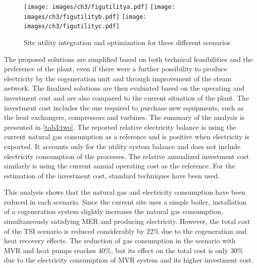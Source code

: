   \vspace{5mm}
 \begin{figure}[!ht]
 \begin{center}
 \texttt{[image: images/ch3/figutilitya.pdf]}
 \texttt{[image: images/ch3/figutilityb.pdf]}
 \texttt{[image: images/ch3/figutilityc.pdf]}
 \caption{Site utility integration and optimization for three different scenarios}
 \label{fig3:VIIII}
 \end{center}
  \vspace{-5mm}
 \end{figure}
 
 The proposed solutions are simplified based on both technical feasibilities and the preference of the plant, even if there were a further possibility to produce electricity by the cogeneration unit and through improvement of the steam network. The finalized solutions are then evaluated based on the operating and investment cost and are also compared to the current situation of the plant. The investment cost includes the one required to purchase new equipments, such as the heat exchangers, compressors and turbines. The summary of the analysis is presented in \cref{tab3:two}. The reported relative electricity balance is using the current natural gas consumption as a reference and is positive when electricity is exported. It accounts only for the utility system balance and does not include electricity consumption of the processes. The relative annualized investment cost similarly is using the current annual operating cost as the reference. For the estimation of the investment cost, standard techniques have been used. 
 
 \label{tab3:two}
 
 This analysis shows that the natural gas and electricity consumption have been reduced in each scenario. 
Since the current site uses a simple boiler, installation of a cogeneration system slightly increases the natural gas consumption, simultaneously satisfying MER and producing electricity. However, the total cost of the TSI scenario is reduced considerably by 22\% due to the cogeneration and heat recovery effects. The reduction of gas consumption in the scenario with MVR and heat pumps reaches 40\%, but its effect on the total cost is only 30\% due to the electricity consumption of MVR system and its higher investment cost.
 
 
